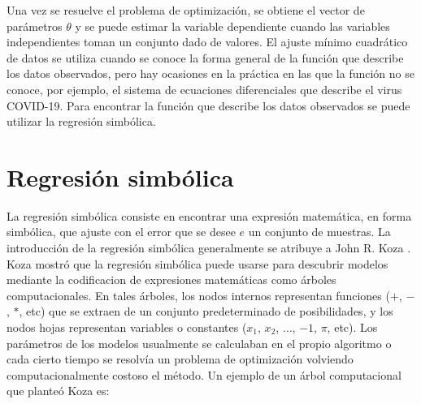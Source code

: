 Una vez se resuelve el problema de optimización, se obtiene el vector de parámetros $\theta$ y se puede estimar la variable dependiente cuando las variables independientes toman un conjunto dado de valores. El ajuste mínimo cuadrático de datos se utiliza cuando se conoce la forma general de la función que describe los datos observados, pero hay ocasiones en la práctica en las que la función no se conoce, por ejemplo, el sistema de ecuaciones diferenciales que describe el virus COVID-19. Para encontrar la función que describe los datos observados se puede utilizar la regresión simbólica.

\section{Regresión simbólica}\label{section:symbolic_regression}

La regresión simbólica consiste en encontrar una expresión matemática, en forma simbólica, que ajuste con el error que se desee $e$ un conjunto de muestras. La introducción de la regresión simbólica generalmente se atribuye a John R. Koza \cite{zelinka2005analytic}. Koza mostró que la regresión simbólica puede usarse para descubrir modelos mediante la codificacion de expresiones matemáticas como árboles computacionales. En tales árboles, los nodos internos representan funciones ($+$, $-$, $*$, etc) que se extraen de un conjunto predeterminado de posibilidades, y los nodos hojas representan variables o constantes ($x_1$, $x_2$, $\dots$, $-1$, $\pi$, etc). Los parámetros de los modelos usualmente se calculaban en el propio algoritmo o cada cierto tiempo se resolvía un problema de optimización volviendo computacionalmente costoso el método. Un ejemplo de un árbol computacional que planteó Koza es:

